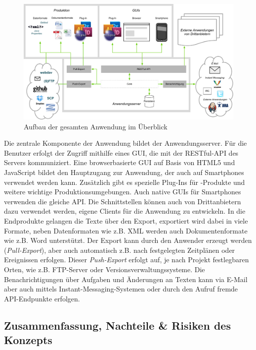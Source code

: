 \begin{figure}[htb]
\begin{center}
\includegraphics[width=\textwidth]{media/GesamtesSystem.pdf}
\caption{Aufbau der gesamten Anwendung im Überblick}
\label{chart:gesamtessystem}
\end{center}
\end{figure}

Die zentrale Komponente der Anwendung bildet der Anwendungsserver. Für die Benutzer erfolgt der Zugriff mithilfe eines GUI, die mit der RESTful-API des Servers kommuniziert. Eine browserbasierte GUI auf Basis von HTML5 und JavaScript bildet den Hauptzugang zur Anwendung, der auch auf Smartphones verwendet werden kann. Zusätzlich gibt es spezielle Plug-Ins für -Produkte und weitere wichtige Produktionsumgebungen. Auch native GUIs für Smartphones verwenden die gleiche API. Die Schnittstellen können auch von Drittanbietern dazu verwendet werden, eigene Clients für die Anwendung zu entwickeln. In die Endprodukte gelangen die Texte über den Export, exportiert wird dabei in viele Formate, neben Datenformaten wie z.B. XML werden auch Dokumentenformate wie z.B. Word unterstützt. Der Export kann durch den Anwender erzeugt werden (\emph{Pull-Export}), aber auch automatisch z.B. nach festgelegten Zeitplänen oder Ereignissen erfolgen. Dieser \emph{Push-Export} erfolgt auf, je nach Projekt festlegbaren Orten, wie z.B. FTP-Server oder Versionsverwaltungssysteme. Die Benachrichtigungen über Aufgaben und Änderungen an Texten kann via E-Mail aber auch mittels Instant-Messaging-Systemen oder durch den Aufruf fremde API-Endpunkte erfolgen.

\pagebreak

\subsection{Zusammenfassung, Nachteile \& Risiken des Konzepts}

